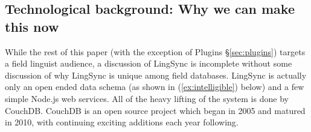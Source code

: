 \documentclass[letterpaper, 12pt, dvips]{mitwpl}
\begin{document}
\subsection{Technological background: Why we can make this now} 
\label{sec:tech}

While the rest of this paper (with the exception of Plugins \S \ref{sec:plugins}) targets a field linguist audience, a discussion of LingSync is incomplete without some discussion of why LingSync is unique among field databases.
LingSync is actually only an open ended  data schema (as shown in (\ref{ex:intelligible}) below) %
and a few simple Node.js web services. All of the heavy lifting of the system is done by CouchDB. CouchDB is an open source  project which began in 2005 and matured in 2010, with continuing exciting additions each year following. 
\end{document}
